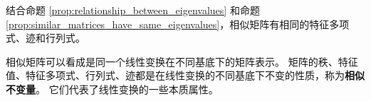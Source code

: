 \begin{corollary}
    结合命题 \ref{prop:relationship_between_eigenvalues} 和命题 \ref{prop:similar_matrices_have_same_eigenvalues}，相似矩阵有相同的特征多项式、迹和行列式。
\end{corollary}

\begin{note}
    相似矩阵可以看成是同一个线性变换在不同基底下的矩阵表示。
    矩阵的秩、特征值、特征多项式、行列式、迹都是在线性变换的不同基底下不变的性质，称为\textbf{相似不变量}。
    它们代表了线性变换的一些本质属性。
\end{note}

\newpage